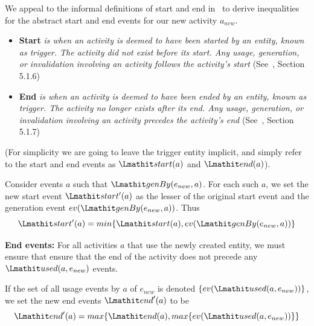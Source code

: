 We appeal to the informal definitions of start and end in~\citep{w3c-prov-dm} to derive inequalities for the abstract start and end events for our new activity $a_{new}$.
% 
\begin{itemize}
\item \textbf{Start} \textit{is when an activity is deemed to have been started by an entity, known as trigger. The activity did not exist before its start. Any usage, generation, or invalidation involving an activity follows the activity's start} (See~\citep{w3c-prov-dm},  Section 5.1.6)

\item \textbf{End} \textit{is when an activity is deemed to have been ended by an entity, known as trigger. The activity no longer exists after its end. Any usage, generation, or invalidation involving an activity precedes the activity's end} (See~\citep{w3c-prov-dm}, Section 5.1.7)
\end{itemize}
(For simplicity we are going to leave the trigger entity implicit, and simply refer to the start and end events as $\start(a)$ and $\ed(a)$).


\begin{definition} 
\label{def:abstract-start-e}
Consider events $a$ such that $\wgby(e_{new},a)$. For each such $a$, we set the new start event $\start'(a)$ as the lesser of the original start event and the generation event $ev(\wgby(e_{new},a))$. Thus
\begin{equation}
\start'(a) = min\{\start(a),ev(\wgby(e_{new},a))\}
\end{equation}
\end{definition}

{\bf End events:} For all activities $a$ that use the newly created entity, we must ensure that ensure that the end of the activity does not precede any $\used(a,e_{new})$ events.
\begin{definition}
  \label{def:abstract-end-e}
  If the set of all usage events by $a$ of $e_{new}$ is denoted $\{ev(\used(a,e_{new}))\}$, we set the new end events $\ed'(a)$ to be
  \begin{equation}
  \ed'(a) = max\{\ed(a), max\{ev(\used(a,e_{new}))\}\}
\end{equation}
\end{definition}

